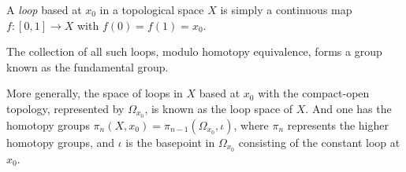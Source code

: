 \documentclass[12pt]{article}
\begin{document}
A {\em loop} based at $x_0$ in a topological space $X$ is simply a continuous map $f : [0,1]\to X$ with $f(0) = f(1) = x_0$.

The collection of all such loops, modulo homotopy equivalence, forms a group known as the fundamental group.

More generally, the space of loops in $X$ based at $x_0$ with the compact-open topology, represented by $\Omega_{x_0}$, is known as the loop space of $X$.  And one has the homotopy groups $\pi_n(X,x_0) = \pi_{n-1}(\Omega_{x_0},\iota)$, where $\pi_n$ represents the higher homotopy groups, and $\iota$ is the basepoint in $\Omega_{x_0}$ consisting of the constant loop at $x_0$.
\end{document}
